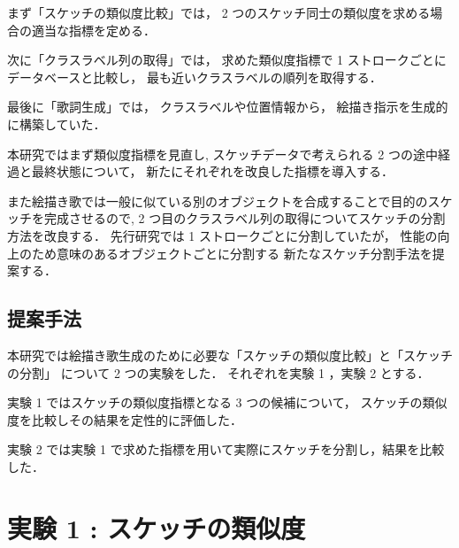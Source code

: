 \documentclass[twocolumn]{jarticle}     %
\begin{document}
まず「スケッチの類似度比較」では，
2 つのスケッチ同士の類似度を求める場合の適当な指標を定める．

次に「クラスラベル列の取得」では，
求めた類似度指標で 1 ストロークごとにデータベースと比較し，
最も近いクラスラベルの順列を取得する．

最後に「歌詞生成」では，
クラスラベルや位置情報から，
絵描き指示を生成的に構築していた．

本研究ではまず類似度指標を見直し,
スケッチデータで考えられる 2 つの途中経過と最終状態について，
新たにそれぞれを改良した指標を導入する．

また絵描き歌では一般に似ている別のオブジェクトを合成することで目的のスケッチを完成させるので,
2 つ目のクラスラベル列の取得についてスケッチの分割方法を改良する．
先行研究では 1 ストロークごとに分割していたが，
性能の向上のため意味のあるオブジェクトごとに分割する
新たなスケッチ分割手法を提案する．


\subsection{提案手法}
本研究では絵描き歌生成のために必要な「スケッチの類似度比較」と「スケッチの分割」
について 2 つの実験をした．
それぞれを実験 1 ，実験 2 とする．

実験 1 ではスケッチの類似度指標となる 3 つの候補について，
スケッチの類似度を比較しその結果を定性的に評価した．

実験 2 では実験 1 で求めた指標を用いて実際にスケッチを分割し，結果を比較した．


\section{実験 1 : スケッチの類似度}
\end{document}
